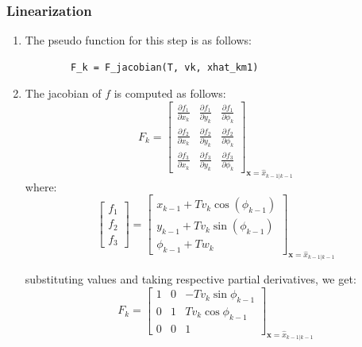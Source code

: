 \documentclass[a4paper,11pt]{article}
\theoremstyle{mytheor}
\begin{document}
\subsubsection{Linearization}
\begin{enumerate}
    \item 
    The pseudo function for this step is as follows: 
    \begin{lstlisting}
        F_k = F_jacobian(T, vk, xhat_km1)
    \end{lstlisting}
    
    \item The jacobian of $f$ is computed as follows: 
    \begin{equation*}
         F_k = \begin{bmatrix}
         \frac{\partial f_1}{\partial x_k} & \frac{\partial f_1}{\partial y_k} & \frac{\partial f_1}{\partial \phi_k} \\ 
         \frac{\partial f_2}{\partial x_k} & \frac{\partial f_2}{\partial y_k} & \frac{\partial f_2}{\partial \phi_k} \\ 
         \frac{\partial f_3}{\partial x_k} & \frac{\partial f_3}{\partial y_k} & \frac{\partial f_3}{\partial \phi_k}
         \end{bmatrix}_{\mathbf{x} = \hat{x}_{k-1|k-1}}
    \end{equation*}
    where: 
    \begin{equation*}
        \begin{bmatrix}
            f_1 \\
            f_2 \\
            f_3 
        \end{bmatrix}
        = 
        \begin{bmatrix}
            x_{k-1} + Tv_k \cos(\phi_{k-1})\\
             y_{k-1} + Tv_k \sin(\phi_{k-1})\\
             \phi_{k-1} + Tw_k 
        \end{bmatrix}_{\mathbf{x} = \hat{x}_{k-1|k-1}}
    \end{equation*}
    
     substituting values and taking respective partial derivatives, we get: 
    \begin{equation*}
         F_k = \begin{bmatrix}
         1 & 0 & -Tv_k \sin{\phi_{k-1}} \\ 
         0 & 1 & Tv_k \cos{\phi_{k-1}} \\ 
         0 & 0 & 1
         \end{bmatrix}_{\mathbf{x} = \hat{x}_{k-1|k-1}}
    \end{equation*}
\end{enumerate}
\end{document}
